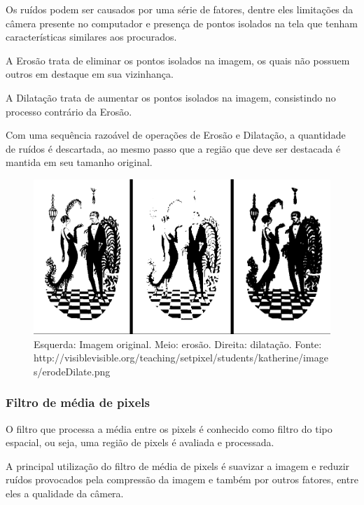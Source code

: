 \documentclass[12pt]{article}
\begin{document}
Os ru\'idos podem ser causados por uma s\'erie de fatores, dentre eles limita\c c\~oes da c\^amera presente no computador
e presen\c ca de pontos isolados na tela que tenham caracter\'isticas similares aos procurados.

A Eros\~ao trata de eliminar os pontos isolados na imagem, os quais n\~ao possuem outros em destaque em sua vizinhan\c ca.

A Dilata\c c\~ao trata de aumentar os pontos isolados na imagem, consistindo no processo contr\'ario da Eros\~ao.

Com uma sequ\^encia razo\'avel de opera\c c\~oes de Eros\~ao e Dilata\c c\~ao, a quantidade de ru\'idos \'e descartada,
ao mesmo passo que a regi\~ao que deve ser destacada \'e mantida em seu tamanho original.

	\begin{figure}[ht!]
	\begin{center}
		\includegraphics[scale=0.3]{img/erodeDilate.png}
		\footnotesize \caption{Esquerda: Imagem original. Meio: eros\~ao. Direita: dilata\c c\~ao. Fonte: http://visiblevisible.org/teaching/setpixel/students/katherine/images/erodeDilate.png }
	\end{center}
	\end{figure}	
\newpage
\subsubsection{Filtro de m\'edia de pixels}
O filtro que processa a m\'edia entre os pixels \'e conhecido como filtro do tipo espacial,
ou seja, uma regi\~ao de pixels \'e avaliada e processada.

A principal utiliza\c c\~ao do filtro de m\'edia de pixels \'e suavizar a imagem e reduzir
ru\'idos provocados pela compress\~ao da imagem e tamb\'em por outros fatores, entre
eles a qualidade da c\^amera.
\end{document}
